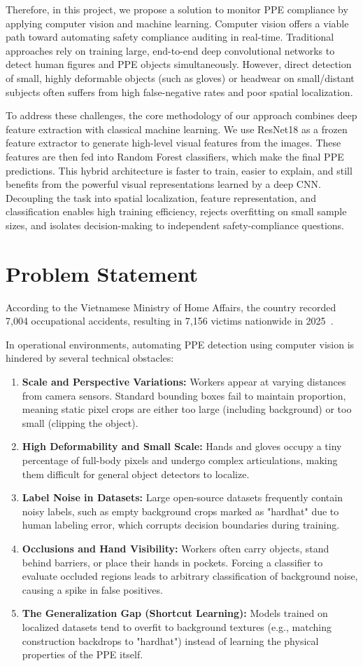\documentclass[11pt,a4paper]{article}
\begin{document}
Therefore, in this project, we propose a solution to monitor PPE compliance by applying computer vision and machine learning. Computer vision offers a viable path toward automating safety compliance auditing in real-time. Traditional approaches rely on training large, end-to-end deep convolutional networks to detect human figures and PPE objects simultaneously. However, direct detection of small, highly deformable objects (such as gloves) or headwear on small/distant subjects often suffers from high false-negative rates and poor spatial localization.

To address these challenges, the core methodology of our approach combines deep feature extraction with classical machine learning. We use ResNet18 as a frozen feature extractor to generate high-level visual features from the images. These features are then fed into Random Forest classifiers, which make the final PPE predictions. This hybrid architecture is faster to train, easier to explain, and still benefits from the powerful visual representations learned by a deep CNN. Decoupling the task into spatial localization, feature representation, and classification enables high training efficiency, rejects overfitting on small sample sizes, and isolates decision-making to independent safety-compliance questions.
\section{Problem Statement}
According to the Vietnamese Ministry of Home Affairs, the country recorded 7,004 occupational accidents, resulting in 7,156 victims nationwide in 2025~\cite{bonoivu2026}.

In operational environments, automating PPE detection using computer vision is hindered by several technical obstacles:
\begin{enumerate}
\item \textbf{Scale and Perspective Variations:} Workers appear at varying distances from camera sensors. Standard bounding boxes fail to maintain proportion, meaning static pixel crops are either too large (including background) or too small (clipping the object).
\item \textbf{High Deformability and Small Scale:} Hands and gloves occupy a tiny percentage of full-body pixels and undergo complex articulations, making them difficult for general object detectors to localize.
\item \textbf{Label Noise in Datasets:} Large open-source datasets frequently contain noisy labels, such as empty background crops marked as "hardhat" due to human labeling error, which corrupts decision boundaries during training.
\item \textbf{Occlusions and Hand Visibility:} Workers often carry objects, stand behind barriers, or place their hands in pockets. Forcing a classifier to evaluate occluded regions leads to arbitrary classification of background noise, causing a spike in false positives.
\item \textbf{The Generalization Gap (Shortcut Learning):} Models trained on localized datasets tend to overfit to background textures (e.g., matching construction backdrops to "hardhat") instead of learning the physical properties of the PPE itself.
\end{enumerate}
\end{document}
